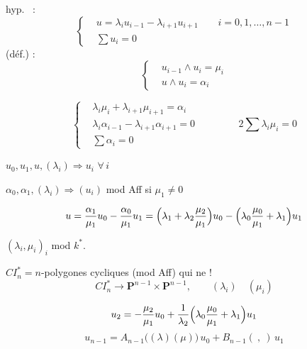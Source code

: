 \documentclass[11pt,a4paper]{article}
\begin{document}
hyp.\  :
\[
\left\lbrace
\begin{aligned}
& u = \lambda_i u_{i-1} - \lambda_{i+1} u_{i+1} \qquad i = 0, 1, \ldots, n-1 \\
& \textstyle\sum u_i = 0
\end{aligned}
\right.
\]
(déf.) :
\[
\left\lbrace
\begin{aligned}
& u_{i-1} \wedge u_i = \mu_i \\
& u \wedge u_i = \alpha_i
\end{aligned}
\right.
\]

\[
\left\lbrace
\begin{aligned}
& \lambda_i \mu_i + \lambda_{i+1} \mu_{i+1} = \alpha_i \\
& \lambda_i \alpha_{i-1} - \lambda_{i+1} \alpha_{i+1} = 0 \\
& \textstyle\sum \alpha_i = 0
\end{aligned}
\right.
\qquad\qquad 2 \sum \lambda_i \mu_i = 0
\]
\struck{(\ill{} \ill{} \ill{})}

$u_0, u_1, u, (\lambda_i) \Rightarrow u_i$ $\forall\, i$

$\alpha_0, \alpha_1, (\lambda_i) \Rightarrow (u_i)$ mod \ill{} Aff \quad
si $\mu_1 \neq 0$

\[
u = \frac{\alpha_1}{\mu_1} u_0 - \frac{\alpha_0}{\mu_1} u_1
= \Bigl( \lambda_1 + \lambda_2 \frac{\mu_2}{\mu_1} \Bigr) u_0
- \Bigl( \lambda_0 \frac{\mu_0}{\mu_1} + \lambda_1 \Bigr) u_1
\]

$(\lambda_i, \mu_i)_i$ mod $k^*$.

$CI_n^* = n$-polygones cycliques (mod Aff) \struck{\ill{}} qui ne
 \ill{} ! \quad \struck{\ill{}} \struck{\ill{}}
\ill{}
\[
CI_n^* \longrightarrow \mathbf{P}^{n-1} \times \mathbf{P}^{n-1}, \qquad
(\lambda_i) \quad (\mu_i)
\]


\[
u_2 = -\frac{\mu_2}{\mu_1} u_0 + \frac{1}{\lambda_2}
\Bigl( \lambda_0 \frac{\mu_0}{\mu_1} + \lambda_1 \Bigr) u_1
\]
\[
u_{n-1} = A_{n-1}\bigl((\lambda)(\mu)\bigr)\, u_0 + B_{n-1}(\ ,\ )\, u_1
\]
\end{document}
